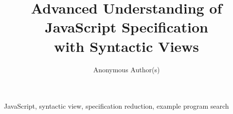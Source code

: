 \documentclass[10pt,conference]{IEEEtran}
\begin{document}
\title{Advanced Understanding of JavaScript Specification\\
with Syntactic Views}

\author{Anonymous Author(s)}

%
%
%
%
%
%

\maketitle



\begin{IEEEkeywords}
JavaScript,
syntactic view,
specification reduction,
example program search
\end{IEEEkeywords}











\balance


\appendix

% 
\end{document}
